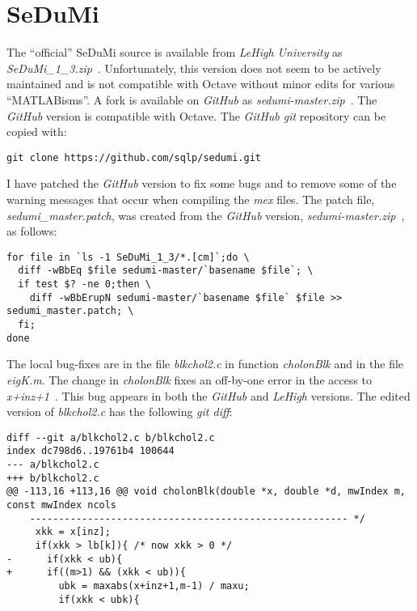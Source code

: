 \documentclass[a4paper,twoside,10pt,english]{report}
\begin{document}
\section*{SeDuMi}
The ``official'' SeDuMi source is available from \emph{LeHigh
University} as \emph{SeDuMi\_1\_3.zip}~\cite{Sturm_SeDuMi_1_3}. Unfortunately,
this version does not seem to be actively maintained and is not compatible 
with Octave without minor edits for various ``MATLABisms''. A fork is available
on \emph{GitHub} as \emph{sedumi-master.zip}~\cite{Sturm_SeDuMi_GitHub}.
The \emph{GitHub} version is compatible with Octave. The \emph{GitHub git} 
repository can be copied with:
\begin{small}
\begin{verbatim}
git clone https://github.com/sqlp/sedumi.git
\end{verbatim}
\end{small}
I have patched the \emph{GitHub} version to fix some bugs and to remove some 
of the warning messages that occur when compiling the \emph{mex} files. The 
patch file, \emph{sedumi\_master.patch}, was created from the \emph{GitHub} 
version, \emph{sedumi-master.zip}~\cite{Sturm_SeDuMi_GitHub}, as follows:
\begin{small}
\begin{verbatim}
for file in `ls -1 SeDuMi_1_3/*.[cm]`;do \
  diff -wBbEq $file sedumi-master/`basename $file`; \
  if test $? -ne 0;then \
    diff -wBbErupN sedumi-master/`basename $file` $file >> sedumi_master.patch; \
  fi;
done 
\end{verbatim}
\end{small}

The local bug-fixes are in the file \emph{blkchol2.c} in function 
\emph{cholonBlk} and in the file \emph{eigK.m}. The change in \emph{cholonBlk} 
fixes an off-by-one error in the access to 
\emph{x+inz+1}~\cite{SeDuMi_BugReport}. This bug appears in both the 
\emph{GitHub} and \emph{LeHigh} versions. The edited version of 
\emph{blkchol2.c} has the following \emph{git diff}:
\begin{small}
\begin{verbatim}
diff --git a/blkchol2.c b/blkchol2.c
index dc798d6..19761b4 100644
--- a/blkchol2.c
+++ b/blkchol2.c
@@ -113,16 +113,16 @@ void cholonBlk(double *x, double *d, mwIndex m, const mwIndex ncols
    ------------------------------------------------------- */
     xkk = x[inz];
     if(xkk > lb[k]){ /* now xkk > 0 */
-      if(xkk < ub){
+      if((m>1) && (xkk < ub)){
         ubk = maxabs(x+inz+1,m-1) / maxu;
         if(xkk < ubk){
\end{verbatim}
\end{small}
\end{document}
